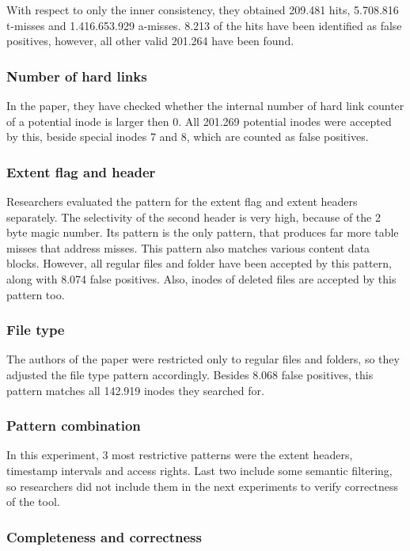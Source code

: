 \documentclass{acm_proc_article-sp}
\begin{document}
With respect to only the inner consistency, they obtained 209.481 hits, 5.708.816 t-misses and 1.416.653.929 a-misses. 8.213 of the hits have been identified as false positives, however, all other valid 201.264 have been found.

\subsubsection{Number of hard links}

In the paper, they have checked whether the internal number of hard link counter of a potential inode is larger then 0. All 201.269 potential inodes were accepted by this, beside special inodes 7 and 8, which are counted as false positives.

\subsubsection{Extent flag and header}

Researchers evaluated the pattern for the extent flag and extent headers separately. The selectivity of the second header is very high, because of the 2 byte magic number. Its pattern is the only pattern, that produces far more table misses that address misses. This pattern also matches various content data blocks. However, all regular files and folder have been accepted by this pattern, along with 8.074 false positives. 
Also, inodes of deleted files are accepted by this pattern too. 

\subsubsection{File type}

The authors of the paper were restricted only to regular files and folders, so they adjusted the file type pattern accordingly. Besides 8.068 false positives, this pattern matches all 142.919 inodes they searched for.

\subsubsection{Pattern combination}

In this experiment, 3 most restrictive patterns were the extent headers, timestamp intervals and access rights. Last two include some semantic filtering, so researchers did not include them in the next experiments to verify correctness of the tool.

\subsubsection{Completeness and correctness}
\end{document}
